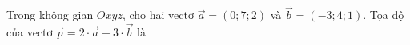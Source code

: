 \begin{ex}
Trong không gian $Oxyz$, cho hai vectơ $\vec a=(0;7;2)$ và $\vec b=(-3;4;1)$. Tọa độ của vectơ $\vec p=2\cdot\vec a-3\cdot\vec b$ là
\end{ex}
